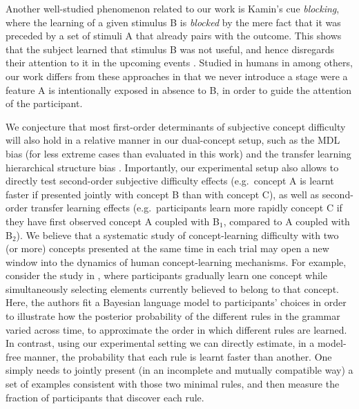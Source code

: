 Another well-studied phenomenon related to our work is Kamin’s cue {\em blocking}, where the learning of a given stimulus B is {\em blocked} by the mere fact that it was preceded by a set of stimuli A that already pairs with the outcome. This shows that the subject learned that stimulus B was not useful, and hence disregards their attention to it in the upcoming events \cite{wagner1970stimulus,mackintosh1975theory,rescorlaw72}. Studied in humans in \cite{chapman1990cue, arcediano1997blocking, kruschke2000blocking} among others, our work differs from these approaches in that we never introduce a stage were a feature A is intentionally exposed in absence to B, in order to guide the attention of the participant.



We conjecture that most first-order determinants of subjective concept difficulty will also hold in a relative manner in our dual-concept setup, such as the MDL bias (for less extreme cases than evaluated in this work) \cite{feldman2003simplicity} and the transfer learning hierarchical structure bias \cite{tano2020towards}. Importantly, our experimental setup also allows to directly test second-order subjective difficulty effects (e.g.\ concept A is learnt faster if presented jointly with concept B than with concept C), as well as second-order transfer learning effects (e.g.\  participants learn more rapidly concept C if they have first observed concept A coupled with B$_1$, compared to A coupled with B$_2$). We believe that a systematic study of concept-learning difficulty with two (or more) concepts presented at the same time in each trial may open a new window into the dynamics of human concept-learning mechanisms. For example, consider the study in \cite{piantadosi2016logical}, where participants gradually learn one concept while simultaneously selecting elements currently believed to belong to that concept. Here, the authors fit a Bayesian language model to participants' choices in order to illustrate how the posterior probability of the different rules in the grammar varied across time, to approximate the order in which different rules are learned. In contrast, using our experimental setting we can directly estimate, in a model-free manner, the probability that each rule is learnt faster than another. One simply needs to jointly present (in an incomplete and mutually compatible way) a set of examples consistent with those two minimal rules, and then measure the fraction of participants that discover each rule.

